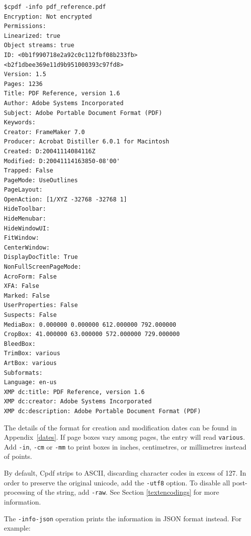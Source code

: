 \documentclass{book}
\begin{document}
\begin{framed}
{\small\begin{verbatim}
$cpdf -info pdf_reference.pdf
Encryption: Not encrypted
Permissions: 
Linearized: true
Object streams: true
ID: <0b1f990718e2a92c0c112fbf08b233fb> <b2f1dbee369e11d9b951000393c97fd8>
Version: 1.5
Pages: 1236
Title: PDF Reference, version 1.6
Author: Adobe Systems Incorporated
Subject: Adobe Portable Document Format (PDF)
Keywords: 
Creator: FrameMaker 7.0
Producer: Acrobat Distiller 6.0.1 for Macintosh
Created: D:20041114084116Z
Modified: D:20041114163850-08'00'
Trapped: False
PageMode: UseOutlines
PageLayout: 
OpenAction: [1/XYZ -32768 -32768 1]
HideToolbar: 
HideMenubar: 
HideWindowUI: 
FitWindow: 
CenterWindow: 
DisplayDocTitle: True
NonFullScreenPageMode: 
AcroForm: False
XFA: False
Marked: False
UserProperties: False
Suspects: False
MediaBox: 0.000000 0.000000 612.000000 792.000000
CropBox: 41.000000 63.000000 572.000000 729.000000
BleedBox: 
TrimBox: various
ArtBox: various
Subformats: 
Language: en-us
XMP dc:title: PDF Reference, version 1.6
XMP dc:creator: Adobe Systems Incorporated
XMP dc:description: Adobe Portable Document Format (PDF)
\end{verbatim}}\end{framed}

\noindent The details of the format for creation and modification dates can be found in
Appendix~\ref{dates}. If page boxes vary among pages, the entry will read \texttt{various}. Add \texttt{-in}, \texttt{-cm} or \texttt{-mm} to print boxes in inches, centimetres, or millimetres instead of points.

By default, Cpdf strips to ASCII, discarding character codes in excess of 127. In order to preserve the original unicode, add the \texttt{-utf8} option. To disable all post-processing of the string, add \texttt{-raw}. See Section \ref{textencodings} for more information.

The \texttt{-info-json} operation prints the information in JSON format instead. For example:
\end{document}
